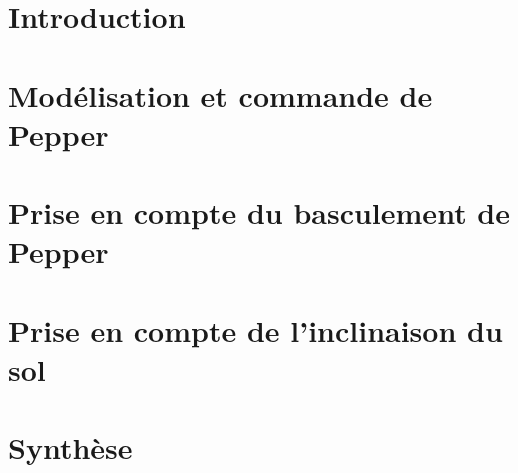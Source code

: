 \documentclass[12pt]{report}
\begin{document}
\newcommand\university{Université de Grenoble}
\newcommand\school{École doctorale EEATS}
\newcommand\structure{Laboratoire: Inria Grenoble Rhône-Alpes \\ Entreprise: Aldebaran}
\newcommand\auteur{Jory Lafaye}
\newcommand\encadrant{Dr. Pierre-Brice Wieber, Inria\\Dr. Cyrille Collette, Aldebaran\\Dr. Sebastien Dalibard, Aldebaran}
\newcommand\directeur{Dr. Bernard Brogliato, Inria\\~\\~}
\newcommand\titre{Commande des mouvements et de l'équilibre \\d'un robot humanoïde à roues omnidirectionnelles}



\tableofcontents
\listoffigures

%
\newpage\cite{bib.miasa.2010}
%



\chapter{Introduction}
	
	
\chapter{Modélisation et commande de Pepper}
	
	
\chapter{Prise en compte du basculement de Pepper}
	
	
\chapter{Prise en compte de l'inclinaison du sol}
	

\chapter{Synthèse}
	
	


\appendix
	
\end{document}
